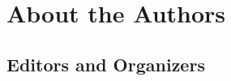 \chapter*{About the Authors}

\newenvironment{authorbio}[2]{
	\subsection*{#1}

	\ifstrequal{#2}{}{}  %
	{
		\begin{wrapfigure}{l}{1in}
				\texttt{[image: \#2]}
		\end{wrapfigure}
	}

	}{ 
	
		\mbox{}
}

\section*{Editors and Organizers}

